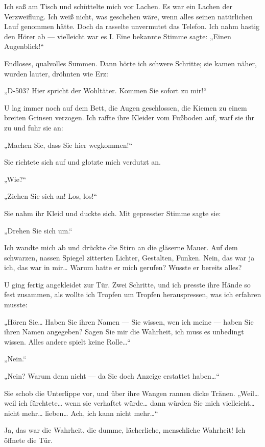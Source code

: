 Ich saß am Tisch und schüttelte mich vor Lachen. Es war ein Lachen
der Verzweiflung. Ich weiß nicht, was geschehen wäre, wenn alles
seinen natürlichen Lauf genommen hätte. Doch da rasselte unvermutet
das Telefon. Ich nahm hastig den Hörer ab — vielleicht war es I.
Eine bekannte Stimme sagte: „Einen Augenblick!“

Endloses,
qualvolles Summen. Dann hörte ich schwere Schritte; sie kamen
näher, wurden lauter, dröhnten wie Erz:

„D-503? Hier spricht der Wohltäter. Kommen Sie sofort zu mir!“

U lag immer noch auf dem Bett, die Augen geschlossen, die Kiemen zu
einem breiten Grinsen verzogen. Ich raffte ihre Kleider vom
Fußboden auf, warf sie ihr zu und fuhr sie an:

„Machen Sie, dass Sie hier wegkommen!“

Sie richtete sich auf und glotzte mich verdutzt an.

„Wie?“

„Ziehen Sie sich an! Los, los!“

Sie nahm ihr Kleid und duckte sich. Mit gepresster Stimme sagte sie:

„Drehen Sie sich um.“

Ich wandte mich ab und drückte die Stirn an die gläserne Mauer. Auf
dem schwarzen, nassen Spiegel zitterten
Lichter, Gestalten, Funken. Nein, das war ja ich, das war in mir\ldots{}
Warum hatte er mich gerufen? Wusste er bereits alles?

U ging fertig angekleidet zur Tür. Zwei Schritte, und ich presste
ihre Hände so fest zusammen, als wollte ich Tropfen um Tropfen
herauspressen, was ich erfahren musste:

„Hören Sie\ldots{} Haben Sie ihren Namen — Sie wissen, wen ich meine —
haben Sie ihren Namen angegeben? Sagen Sie mir die Wahrheit, ich
muss es unbedingt wissen. Alles andere spielt keine Rolle\ldots{}“

„Nein.“

„Nein? Warum denn nicht — da Sie doch Anzeige erstattet haben\ldots{}“

Sie schob die Unterlippe vor, und über ihre Wangen rannen dicke
Tränen. „Weil\ldots{} weil ich fürchtete\ldots{} wenn sie verhaftet würde\ldots{}
dann würden Sie mich vielleicht\ldots{} nicht mehr\ldots{} lieben\ldots{} Ach, ich
kann nicht mehr\ldots{}“

Ja, das war die Wahrheit, die dumme, lächerliche, menschliche
Wahrheit! Ich öffnete die Tür.

